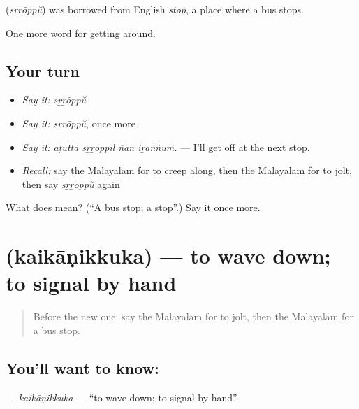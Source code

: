 \begin{cousinweb}
\textbf{} (\emph{sṟṟōppŭ}) was borrowed from English \emph{stop}, a place where a bus stops.
\end{cousinweb}

\begin{grammarlens}[title={What you've built}]
One more word for getting around.
\end{grammarlens}

\subsection*{Your turn}
\begin{itemize}
\raggedright
  \item \emph{Say it:} \emph{sṟṟōppŭ}
  \item \emph{Say it:} \emph{sṟṟōppŭ}, once more
  \item \emph{Say it:} \emph{aṭutta sṟṟōppil ñān iṟaṅṅuṁ.} — I'll get off at the next stop.
  \item \emph{Recall:} say the Malayalam for to creep along, then the Malayalam for to jolt, then say \emph{sṟṟōppŭ} again
\end{itemize}

\begin{tcolorbox}[breakable,colback=teal!4,colframe=teal!35!black,title={Before you move on}]
What does  mean? (\textquotedblleft{}A bus stop; a stop\textquotedblright{}.) Say it once more.
\end{tcolorbox}
\section[\texorpdfstring{\ml{കൈകാണിക്കുക} (kaikāṇikkuka)}{കൈകാണിക്കുക (kaikāṇikkuka)}]{ (kaikāṇikkuka) — to wave down; to signal by hand}

\label{lesson:ML-C473-kaikanikkuka}



\begin{quote}
Before the new one: say the Malayalam for to jolt, then the Malayalam for a bus stop.
\end{quote}

\subsection*{You'll want to know: }
\textbf{} — \emph{kaikāṇikkuka} — \textquotedblleft{}to wave down; to signal by hand\textquotedblright{}.

